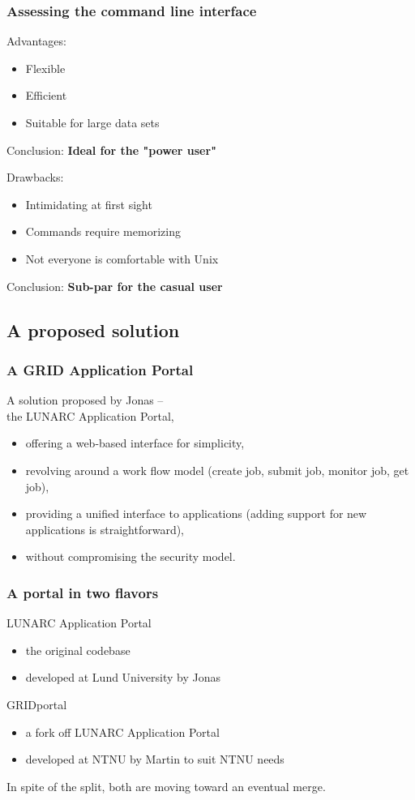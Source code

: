 \documentclass{beamer}
\begin{document}
\begin{frame}
  \frametitle{Assessing the command line interface}

	Advantages:
  \begin{itemize}
  	\item Flexible
	  \item Efficient
	  \item Suitable for large data sets
  \end{itemize}
  Conclusion: {\bf Ideal for the "power user"}
	\bigskip
	
  Drawbacks:
  \begin{itemize}
  	\item Intimidating at first sight
	  \item Commands require memorizing
	  \item Not everyone is comfortable with Unix
  \end{itemize}
  Conclusion: {\bf Sub-par for the casual user}
\end{frame}



\subsection{A proposed solution}

\begin{frame}
  \frametitle{A GRID Application Portal}

	A solution proposed by Jonas --\\ the LUNARC Application Portal,
  \begin{itemize}
  	\item offering a web-based interface for simplicity,
  	\item revolving around a work flow model (create job, submit job, monitor job, get job),
  	\item providing a unified interface to applications (adding support for new applications is straightforward),
  	\item without compromising the security model.
  \end{itemize}	
	
\end{frame}

\begin{frame}
  \frametitle{A portal in two flavors}

	LUNARC Application Portal
  \begin{itemize}
  	\item the original codebase
	  \item developed at Lund University by Jonas
  \end{itemize}
	\bigskip
	
  GRIDportal
  \begin{itemize}
  	\item a fork off LUNARC Application Portal
	  \item developed at NTNU by Martin to suit NTNU needs
  \end{itemize}
  \bigskip
  
  In spite of the split, both are moving toward an eventual merge.
\end{frame}
\end{document}
